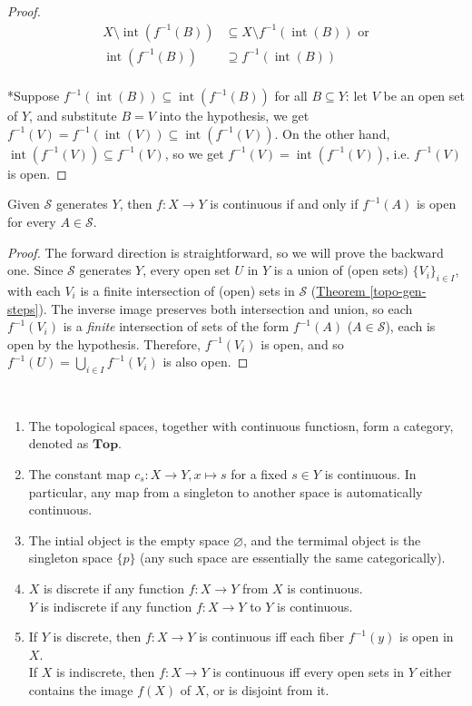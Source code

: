 \documentclass{treatise}
\begin{document}
\begin{proof}
\begin{align*}
    X \setminus \operatorname{int}(f^{-1}(B)) & \subseteq X \setminus f^{-1}(\operatorname{int}(B)) \mbox{ or}
    \\
    \operatorname{int}(f^{-1}(B)) & \supseteq f^{-1}(\operatorname{int}(B))
\end{align*}
\\
*Suppose $f^{-1}(\operatorname{int}(B)) \subseteq \operatorname{int}(f^{-1}(B))$ for all $B \subseteq Y$: let $V$ be an open set of $Y$, and substitute $B = V$ into the hypothesis, we get $f^{-1}(V) = f^{-1}(\operatorname{int}(V)) \subseteq \operatorname{int}(f^{-1}(V))$. On the other hand, $\operatorname{int}(f^{-1}(V)) \subseteq f^{-1}(V)$, so we get $f^{-1}(V) = \operatorname{int}(f^{-1}(V))$, i.e. $f^{-1}(V)$ is open.
\end{proof}
\begin{proposition} \label{cont-gen-equiv-def}
Given $\mathcal{S}$ generates $Y$, then $f: X \to Y$ is continuous if and only if $f^{-1}(A)$ is open for every $A \in \mathcal{S}$.
\end{proposition}
\begin{proof}
The forward direction is straightforward, so we will prove the backward one. Since $\mathcal{S}$ generates $Y$, every open set $U$ in $Y$ is a union of (open sets) $\{ V_i \}_{i \in I}$, with each $V_i$ is a finite intersection of (open) sets in $\mathcal{S}$ (\hyperref[topo-gen-steps]{Theorem \ref*{topo-gen-steps}}). The inverse image preserves both intersection and union, so each $f^{-1}(V_i)$ is a \textit{finite} intersection of sets of the form $f^{-1}(A)$ ($A \in \mathcal{S}$), each is open by the hypothesis. Therefore, $f^{-1}(V_i)$ is open, and so $f^{-1}(U) = \bigcup_{i \in I} f^{-1}(V_i)$ is also open.
\end{proof}
\begin{theorem} \label{topo-cat}\ 
\begin{enumerate}
    \item The topological spaces, together with continuous functiosn, form a category, denoted as $\mathbf{Top}$.
    \item The constant map $c_s: X \to Y, x \mapsto s$ for a fixed $s \in Y$ is continuous. In particular, any map from a singleton to another space is automatically continuous.
    \item The intial object is the empty space $\varnothing$, and the termimal object is the singleton space $\{ p \}$ (any such space are essentially the same categorically).
    \item $X$ is discrete if any function $f: X \to Y$ from $X$ is continuous.
    \\
    $Y$ is indiscrete if any function $f: X \to Y$ to $Y$ is continuous.
    \item If $Y$ is discrete, then $f: X \to Y$ is continuous iff each fiber $f^{-1}(y)$ is open in $X$.
    \\
    If $X$ is indiscrete, then $f: X \to Y$ is continuous iff every open sets in $Y$ either contains the image $f(X)$ of $X$, or is disjoint from it.
\end{enumerate}
\end{theorem}
\end{document}
